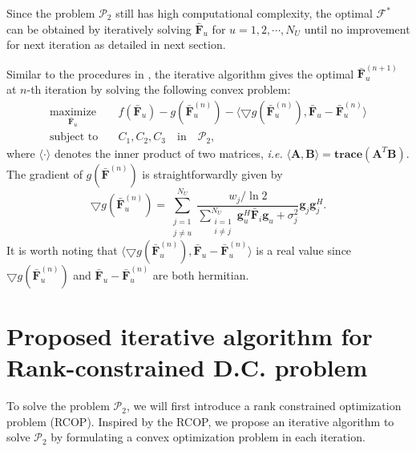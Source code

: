 \documentclass[10pt,journal,twocolumn,twoside]{IEEEtran}
\begin{document}
Since the problem $\mathcal{P}_2$ still has high computational complexity, the optimal $\bm{\mathcal{F}}^*$ can be obtained by iteratively solving $\bar{\bm{F}}_u$ for $u = 1,2,\cdots, N_U$ until no improvement for next iteration as detailed in next section.

Similar to the procedures in \cite{kha2012fast}, the iterative algorithm gives the optimal $\bar{\bm{F}}_u^{(n+1)}$ at $n$-th iteration by solving the following convex problem:
\begin{align}\label{DC}
\underset{\bar{\bm{F}}_u}{\text{maximize}}&\quad f(\bar{\bm{F}}_u) - g(\bar{\bm{F}}^{(n)}_u) - \langle \bigtriangledown g(\bar{\bm{F}}^{(n)}_u), \bar{\bm{F}}_u -  \bar{\bm{F}}_u^{(n)} \rangle\\ \nonumber
\text{subject to}& \quad C_1, C_2, C_3\quad \text{in} \quad \mathcal{P}_2,
\end{align}
where $\langle \cdot \rangle$ denotes the inner product of two matrices, \textit{i.e.} $\langle \bm{A}, \bm{B} \rangle = \textbf{trace}(\bm{A}^T \bm{B})$. The gradient of $g(\bar{\bm{F}}^{(n)})$ is straightforwardly given by
\begin{equation}
	\bigtriangledown g(\bar{\bm{F}}^{(n)}_u) = \sum_{\substack{j=1 \\ j\neq u}}^{N_U}\frac{w_j/\ln 2}{\sum_{\substack{i=1 \\ i\neq j}}^{N_U} \bm{g}_{u}^H \bar{\bm{F}}_i\bm{g}_{u} +\sigma^2_j} \bm{g}_{j} \bm{g}_{j}^H.
\end{equation}
It is worth noting that $\langle \bigtriangledown g(\bar{\bm{F}}^{(n)}_u), \bar{\bm{F}}_u -  \bar{\bm{F}}_u^{(n)} \rangle$ is a real value since $\bigtriangledown g(\bar{\bm{F}}^{(n)}_u)$ and $\bar{\bm{F}}_u -  \bar{\bm{F}}_u^{(n)}$ are both hermitian.

\section{Proposed iterative algorithm for Rank-constrained D.C. problem}

To solve the problem $\mathcal{P}_2$, we will first introduce a rank constrained optimization problem (RCOP). Inspired by the RCOP, we propose an iterative algorithm to solve $\mathcal{P}_2$ by formulating a convex optimization problem in each iteration.
\end{document}
